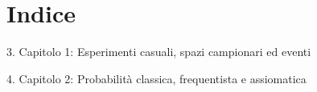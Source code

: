 \section*{Indice}
\begin{flushleft}
3. Capitolo 1: Esperimenti casuali, spazi campionari ed eventi

4. Capitolo 2: Probabilità classica, frequentista e assiomatica
\end{flushleft}